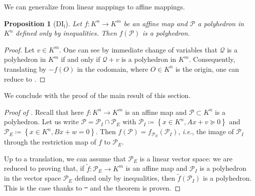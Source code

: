 \documentclass[sigconf]{acmart}
\newcommand{\PP}{\mathcal{P}}
\newcommand{\Qc}{\mathcal{Q}}
\newtheorem{proposition}[theorem]{Proposition}
\providecommand{\DIFaddtex}[1]{{\protect\color{blue}\uwave{#1}}} %
\providecommand{\DIFdeltex}[1]{{\protect\color{red}\sout{#1}}}                      %
\providecommand{\DIFaddbegin}{} %
\providecommand{\DIFaddend}{} %
\providecommand{\DIFdelbegin}{} %
\providecommand{\DIFdelend}{} %
\providecommand{\DIFadd}[1]{\texorpdfstring{\DIFaddtex{#1}}{#1}} %
\providecommand{\DIFdel}[1]{\texorpdfstring{\DIFdeltex{#1}}{}} %
\newcommand{\DIFscaledelfig}{0.5}
\newlength{\DIFdelgraphicswidth} %
\newlength{\DIFdelgraphicsheight} %
\newcommand{\DIFaddincludegraphics}[2][]{{\color{blue}\fbox{\DIFOincludegraphics[#1]{#2}}}} %
\newcommand{\DIFdelincludegraphics}[2][]{%
\sbox{\DIFdelgraphicsbox}{\DIFOincludegraphics[#1]{#2}}%
\settoboxwidth{\DIFdelgraphicswidth}{\DIFdelgraphicsbox} %
\settoboxtotalheight{\DIFdelgraphicsheight}{\DIFdelgraphicsbox} %
\scalebox{\DIFscaledelfig}{%
\parbox[b]{\DIFdelgraphicswidth}{\usebox{\DIFdelgraphicsbox}\\[-\baselineskip] \rule{\DIFdelgraphicswidth}{0em}}\llap{\resizebox{\DIFdelgraphicswidth}{\DIFdelgraphicsheight}{%
\setlength{\unitlength}{\DIFdelgraphicswidth}%
\begin{picture}(1,1)%
\thicklines\linethickness{2pt} %
{\color[rgb]{1,0,0}\put(0,0){\framebox(1,1){}}}%
{\color[rgb]{1,0,0}\put(0,0){\line( 1,1){1}}}%
{\color[rgb]{1,0,0}\put(0,1){\line(1,-1){1}}}%
\end{picture}%
}\hspace*{3pt}}} %
} %
\DeclareRobustCommand{\DIFaddbegin}{\DIFOaddbegin \let\includegraphics\DIFaddincludegraphics} %
\DeclareRobustCommand{\DIFaddend}{\DIFOaddend \let\includegraphics\DIFOincludegraphics} %
\DeclareRobustCommand{\DIFdelbegin}{\DIFOdelbegin \let\includegraphics\DIFdelincludegraphics} %
\DeclareRobustCommand{\DIFdelend}{\DIFOaddend \let\includegraphics\DIFOincludegraphics} %
\begin{document}
We can generalize from linear mappings to affine mappings.
\begin{proposition}[DI${}_{\mathrm{i}}$]
Let $f : K^n \to K^m$ be an affine map and $\PP$ a polyhedron in $K^n$ defined only by inequalities.
Then $f(\PP)$ is a polyhedron. \label{prop:DIi}
\end{proposition}
\begin{proof}
  Let $v \in K^m$. One can see by immediate change
  of variables that $\Qc$ is a polyhedron in $K^m$ if and only if
  $\Qc+v$ is a polyhedron in $K^m$.
  Consequently, translating by $-f(O)$ in the codomain, where
  $O \in K^n$ is the origin, one can reduce to .
\end{proof}

We conclude with the proof of the main result of this section.

\begin{proof}[Proof of ]
Recall that here $f : K^n \to K^m$ is an affine map and $\PP \subset K^n$ is a polyhedron.
Let us write $\PP = \PP_I \cap \PP_E$
with $\PP_I \coloneq \left\lbrace x \in K^n,  Ax+v \succeq 0 \right\rbrace$
and $\PP_E \coloneq \left\lbrace x \in K^n,  Bx+w=0 \right\rbrace$.
Then $f(\PP) = f_{\PP_E}(\PP_I)$, {\it i.e.}, the image of $\PP_I$ through the restriction
map of $f$ to $\PP_E$.

Up to a translation, we can assume that $\PP_E$ is a linear vector space:
we are reduced to proving that, if $\tilde{f}: \PP_E \to K^m$ is an affine map
and $\PP_I$ is a polyhedron in the vector space $\PP_E$ defined only by inequalities,
then $\tilde{f}(\PP_I)$ is a polyhedron. This is the case thanks to \DIFdelbegin \DIFdel{\mbox{%
}\hskip0pt%
}\DIFdelend \DIFaddbegin \DIFadd{Proposition \ref{prop:DIi}
}\DIFaddend and the theorem is proven.
\end{proof}
\end{document}
